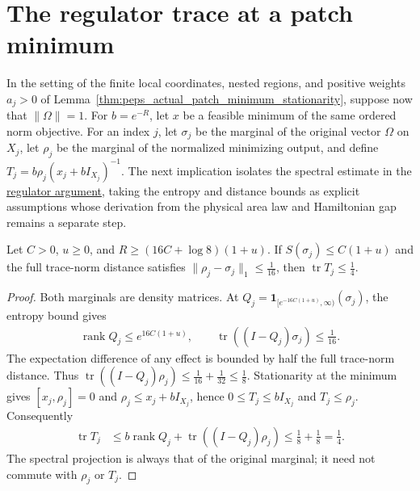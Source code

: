 \section{The regulator trace at a patch minimum}
\label{sec:peps_actual_patch_regulator_trace}

In the setting of the finite local coordinates, nested regions, and positive weights
$a_j>0$ of Lemma~\ref{thm:peps_actual_patch_minimum_stationarity}, suppose now
that $\|\Omega\|=1$. For $b=e^{-R}$, let $x$ be a feasible minimum
of the same ordered norm objective. For an index $j$, let $\sigma_j$ be
the marginal of the original vector $\Omega$ on $X_j$, let $\rho_j$
be the marginal of the normalized minimizing output, and define
$T_j=b\rho_j(x_j+bI_{X_j})^{-1}$.
The next implication isolates the spectral estimate in the
\href{https://github.com/openai/math/blob/adc7f1241b42e322a6451854ab7e4b4c146bf78a/preprints/Polynomial-PEPS-approximation-of-gapped-square-grid-ground-states-September-24-2026/build/sections/03-patches.tex\#L362-L418}{regulator argument},
taking the entropy and distance bounds as explicit assumptions whose derivation
from the physical area law and Hamiltonian gap remains a separate step.

\begin{lemma}
    \label{thm:peps_actual_patch_regulator_trace}
    \leanok
    Let $C>0$, $u\ge0$, and
    $R\ge(16C+\log8)(1+u)$. If
    $S(\sigma_j)\le C(1+u)$ and the full trace-norm distance satisfies
    $\|\rho_j-\sigma_j\|_1\le\tfrac1{16}$,
    then $\operatorname{tr}T_j\le\tfrac14$.
\end{lemma}
\begin{proof}
    \leanok
    Both marginals are density matrices. At
    $Q_j=\mathbf1_{[e^{-16C(1+u)},\infty)}(\sigma_j)$, the entropy bound gives
    \begin{align}
        \operatorname{rank}Q_j\le e^{16C(1+u)},\qquad
        \operatorname{tr}((I-Q_j)\sigma_j)\le\frac1{16}.
    \end{align}
    The expectation difference of any effect is bounded by half the full
    trace-norm distance. Thus
    $\operatorname{tr}((I-Q_j)\rho_j)\le\tfrac1{16}+\tfrac1{32}\le\tfrac18$.
    Stationarity at the minimum gives
    $[x_j,\rho_j]=0$ and $\rho_j\le x_j+bI_{X_j}$, hence
    $0\le T_j\le bI_{X_j}$ and $T_j\le\rho_j$. Consequently
    \begin{align}
        \operatorname{tr}T_j
         & \le b\operatorname{rank}Q_j+
        \operatorname{tr}((I-Q_j)\rho_j)
        \le\frac18+\frac18=\frac14.
    \end{align}
    The spectral projection is always that of the original marginal;
    it need not commute with $\rho_j$ or $T_j$.
\end{proof}
